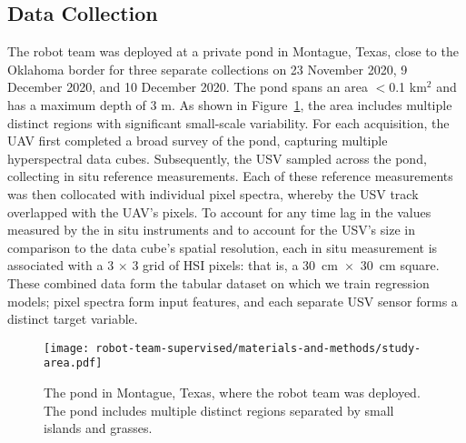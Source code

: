\subsection{Data Collection}

The robot team was deployed at a private pond in Montague, Texas, close to the Oklahoma border for three separate collections on 23 November 2020, 9 December 2020, and 10 December 2020. The pond spans an area $<$0.1 km$^{2}$ and has a maximum depth of 3 m. As shown in Figure~\ref{fig:study-area}, the area includes multiple distinct regions with significant small-scale variability. For each acquisition, the UAV first completed a broad survey of the pond, capturing multiple hyperspectral data cubes. Subsequently, the USV sampled across the pond, collecting in situ reference measurements. Each of these reference measurements was then collocated with individual pixel spectra, whereby the USV track overlapped with the UAV's pixels. To account for any time lag in the values measured by the in situ instruments and to account for the USV's size in comparison to the data cube's spatial resolution, each in situ measurement is associated with a 3 $\times$ 3 grid of HSI pixels: that is, a \mbox{30 cm $\times$ 30 cm} square. These combined data form the tabular dataset on which we train regression models; pixel spectra form input features, and each separate USV sensor forms a distinct target variable.

\begin{figure}[H]
\centering
\vspace{-0.1in}
\hspace{-9pt}\texttt{[image: robot-team-supervised/materials-and-methods/study-area.pdf]}
\vspace{-0.1in}
\caption{The pond in Montague, Texas, where the robot team was deployed. The pond includes multiple distinct regions separated by small islands and grasses. \label{fig:study-area}}
\end{figure}  



